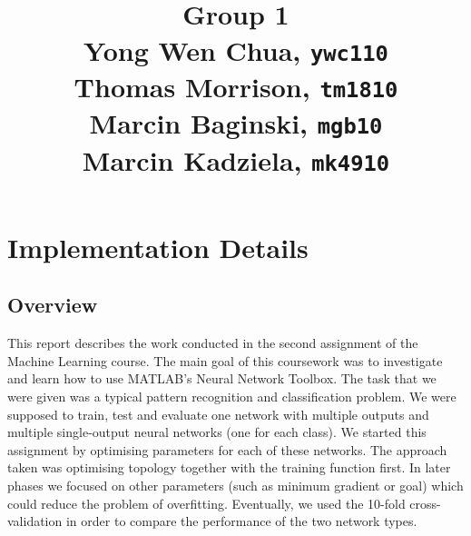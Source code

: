 \documentclass[a4paper]{article}
\title{
\vspace{2in}
\textmd{\textbf{\hmwkTitle}}\\
\vspace{3in}
\textbf{Group 1}\\
Yong Wen Chua, \texttt{ywc110}\\
Thomas Morrison, \texttt{tm1810}\\
Marcin Baginski, \texttt{mgb10}\\
Marcin Kadziela, \texttt{mk4910}
}
\date{} %
\begin{document}
\maketitle



\newpage
\tableofcontents
\newpage


\section{Implementation Details}
\subsection{Overview}
This report describes the work conducted in the second assignment of the Machine Learning course. The main goal of this coursework was to investigate and learn how to use MATLAB's Neural Network Toolbox. The task that we were given was a typical pattern recognition and classification problem. We were supposed to train, test and evaluate one network with multiple outputs and multiple single-output neural networks (one for each class). We started this assignment by optimising parameters for each of these networks. The approach taken was optimising topology together with the training function first. In later phases we focused on other parameters (such as minimum gradient or goal) which could reduce the problem of overfitting. Eventually, we used the 10-fold cross-validation in order to compare the performance of the two network types.
\end{document}
